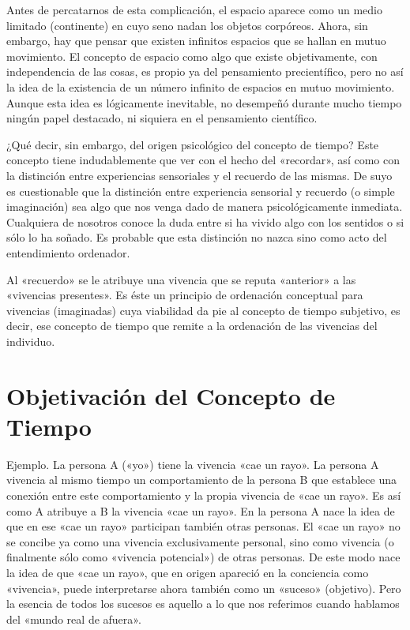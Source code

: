 \documentclass[spanish]{book}
\begin{document}
Antes de percatarnos de esta complicación, el espacio aparece como un medio
limitado (continente) en cuyo seno nadan los objetos corpóreos. Ahora, sin embargo,
hay que pensar que existen infinitos espacios que se hallan en mutuo movimiento. El
concepto de espacio como algo que existe objetivamente, con independencia de las
cosas, es propio ya del pensamiento precientífico, pero no así la idea de la existencia de
un número infinito de espacios en mutuo movimiento. Aunque esta idea es lógicamente
inevitable, no desempeñó durante mucho tiempo ningún papel destacado, ni siquiera
en el pensamiento científico.

¿Qué decir, sin embargo, del origen psicológico del concepto de tiempo? Este
concepto tiene indudablemente que ver con el hecho del «recordar», así como con la
distinción entre experiencias sensoriales y el recuerdo de las mismas. De suyo es
cuestionable que la distinción entre experiencia sensorial y recuerdo (o simple
imaginación) sea algo que nos venga dado de manera psicológicamente inmediata.
Cualquiera de nosotros conoce la duda entre si ha vivido algo con los sentidos o si sólo
lo ha soñado. Es probable que esta distinción no nazca sino como acto del
entendimiento ordenador.

Al «recuerdo» se le atribuye una vivencia que se reputa «anterior» a las «vivencias
presentes». Es éste un principio de ordenación conceptual para vivencias (imaginadas)
cuya viabilidad da pie al concepto de tiempo subjetivo, es decir, ese concepto de
tiempo que remite a la ordenación de las vivencias del individuo.

\section{Objetivación del Concepto de Tiempo}

Ejemplo. La persona A («yo») tiene la vivencia «cae
un rayo». La persona A vivencia al mismo tiempo un comportamiento de la persona B
que establece una conexión entre este comportamiento y la propia vivencia de «cae un
rayo». Es así como A atribuye a B la vivencia «cae un rayo». En la persona A nace la
idea de que en ese «cae un rayo» participan también otras personas. El «cae un rayo»
no se concibe ya como una vivencia exclusivamente personal, sino como vivencia (o
finalmente sólo como «vivencia potencial») de otras personas. De este modo nace la
idea de que «cae un rayo», que en origen apareció en la conciencia como «vivencia»,
puede interpretarse ahora también como un «suceso» (objetivo). Pero la esencia de
todos los sucesos es aquello a lo que nos referimos cuando hablamos del «mundo
real de afuera».
\end{document}
